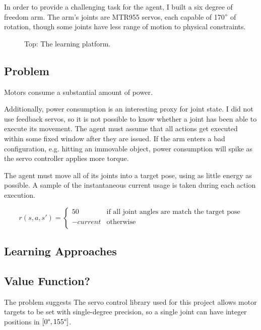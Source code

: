 \documentclass{article}
\begin{document}
In order to provide a challenging task for the agent, I built a six degree of freedom arm. The arm's joints are MTR955 servos, each capable of 170$\degree$ of rotation, though some joints have less range of motion to physical constraints.


\begin{figure}
	\centering
	\caption{Top: The learning platform.}
	\label{fig:platform}
\end{figure}


\subsection{Problem}

Motors consume a substantial amount of power.

Additionally, power consumption is an interesting proxy for joint state. I did not use feedback servos, so it is not possible to know whether a joint has been able to execute its movement. The agent must assume that all actions get executed within some fixed window after they are issued. If the arm enters a bad configuration, e.g. hitting an immovable object, power consumption will spike as the servo controller applies more torque.

The agent must move all of its joints into a target pose, using as little energy as possible. A sample of the instantaneous current usage is taken during each action execution.

\[ r(s,a,s') =  \left\{
\begin{array}{ll}
	50 & \text{if all joint angles are match the target pose} \\
	-current & \text{otherwise} \\
\end{array} 
\right. \]


\subsection{Learning Approaches}

\subsection{Value Function?}

The problem suggests The servo control library used for this project allows motor targets to be set with single-degree precision, so a single joint can have integer positions in  $[0\degree, 155\degree]$.
\end{document}

